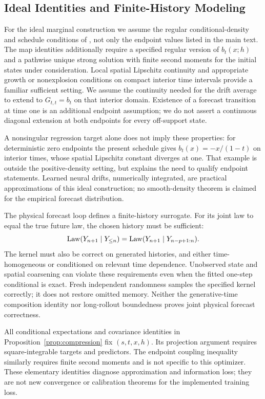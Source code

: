 \subsection{Ideal Identities and Finite-History Modeling}
\label{app:method-assumptions}
For the ideal marginal construction we assume the regular conditional-density and schedule conditions of \citet{chen2024forecasting}, not only the endpoint values listed in the main text. The map identities additionally require a specified regular version of $b_t(x;h)$ and a pathwise unique strong solution with finite second moments for the initial states under consideration. Local spatial Lipschitz continuity and appropriate growth or nonexplosion conditions on compact interior time intervals provide a familiar sufficient setting. We assume the continuity needed for the drift average to extend to $G_{t,t}=b_t$ on that interior domain. Existence of a forecast transition at time one is an additional endpoint assumption; we do not assert a continuous diagonal extension at both endpoints for every off-support state.

A nonsingular regression target alone does not imply these properties: for deterministic zero endpoints the present schedule gives $b_t(x)=-x/(1-t)$ on interior times, whose spatial Lipschitz constant diverges at one. That example is outside the positive-density setting, but explains the need to qualify endpoint statements. Learned neural drifts, numerically integrated, are practical approximations of this ideal construction; no smooth-density theorem is claimed for the empirical forecast distribution.

The physical forecast loop defines a finite-history surrogate. For its joint law to equal the true future law, the chosen history must be sufficient:
\begin{equation}
\operatorname{Law}(Y_{n+1}\mid Y_{\le n})
=\operatorname{Law}(Y_{n+1}\mid Y_{n-p+1:n}).
\end{equation}
The kernel must also be correct on generated histories, and either time-homogeneous or conditioned on relevant time dependence. Unobserved state and spatial coarsening can violate these requirements even when the fitted one-step conditional is exact. Fresh independent randomness samples the specified kernel correctly; it does not restore omitted memory. Neither the generative-time composition identity nor long-rollout boundedness proves joint physical forecast correctness.

All conditional expectations and covariance identities in Proposition~\ref{prop:compression} fix $(s,t,x,h)$. Its projection argument requires square-integrable targets and predictors. The endpoint coupling inequality similarly requires finite second moments and is not specific to this optimizer. These elementary identities diagnose approximation and information loss; they are not new convergence or calibration theorems for the implemented training loss.


